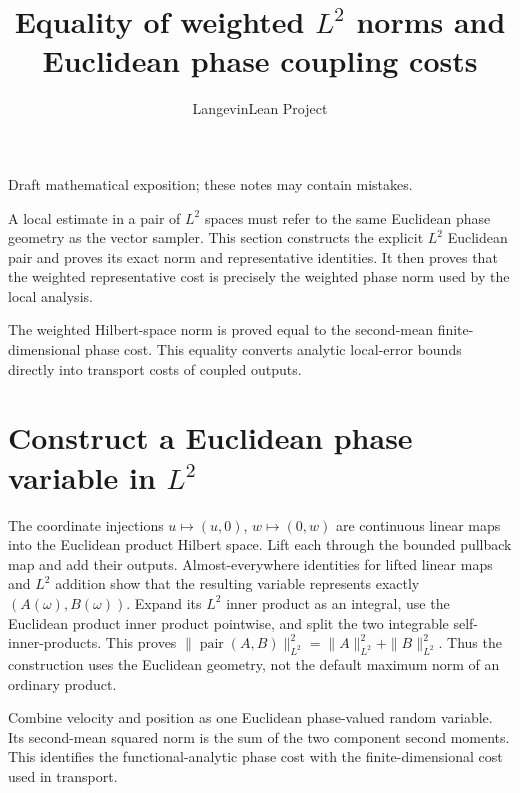 \documentclass[11pt,a4paper]{article}
\title{\texorpdfstring{Equality of weighted \(L^{2}\) norms and Euclidean phase coupling costs}{Equality of weighted L² norms and Euclidean phase coupling costs}}
\author{LangevinLean Project}
\date{}
\begin{document}
\maketitle
Draft mathematical exposition; these notes may contain mistakes.


A local estimate in a pair of \(L^{2}\) spaces must refer to the same Euclidean phase geometry as the vector sampler. This section constructs the explicit \(L^{2}\) Euclidean pair and proves its exact norm and representative identities. It then proves that the weighted representative cost is precisely the weighted phase norm used by the local analysis.



The weighted Hilbert-space norm is proved equal to the second-mean finite-dimensional phase cost. This equality converts analytic local-error bounds directly into transport costs of coupled outputs.


\section{\texorpdfstring{Construct a Euclidean phase variable in \(L^{2}\)}{Construct a Euclidean phase variable in L²}}


The coordinate injections \(u\mapsto(u,0)\), \(w\mapsto(0,w)\) are continuous linear maps into the Euclidean product Hilbert space. Lift each through the bounded pullback map and add their outputs. Almost-everywhere identities for lifted linear maps and \(L^{2}\) addition show that the resulting variable represents exactly \((A(\omega),B(\omega))\). Expand its \(L^{2}\) inner product as an integral, use the Euclidean product inner product pointwise, and split the two integrable self-inner-products. This proves \(\|\operatorname{pair}(A,B)\|_{L^2}^2=\|A\|_{L^2}^2+\|B\|_{L^2}^2\). Thus the construction uses the Euclidean geometry, not the default maximum norm of an ordinary product.



Combine velocity and position as one Euclidean phase-valued random variable. Its second-mean squared norm is the sum of the two component second moments. This identifies the functional-analytic phase cost with the finite-dimensional cost used in transport.
\end{document}
